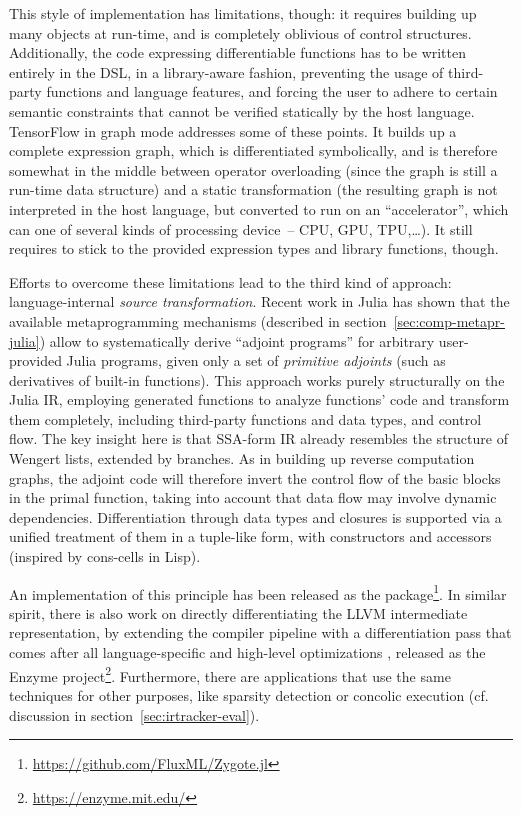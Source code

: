 This style of implementation has limitations, though: it requires building up many objects at
run-time, and is completely oblivious of control structures.  Additionally, the code expressing
differentiable functions has to be written entirely in the DSL, in a library-aware fashion,
preventing the usage of third-party functions and language features, and forcing the user to adhere
to certain semantic constraints that cannot be verified statically by the host language.  TensorFlow
in graph mode addresses some of these points.  It builds up a complete expression graph, which is
differentiated symbolically, and is therefore somewhat in the middle between operator overloading
(since the graph is still a run-time data structure) and a static transformation (the resulting
graph is not interpreted in the host language, but converted to run on an \enquote{accelerator},
which can one of several kinds of processing device~-- CPU, GPU, TPU,\ldots).  It still requires to
stick to the provided expression types and library functions, though.

Efforts to overcome these limitations lead to the third kind of approach: language-internal
\emph{source transformation}.  Recent work in Julia \parencite{innes2018don} has shown that the
available metaprogramming mechanisms (described in section~\ref{sec:comp-metapr-julia}) allow to
systematically derive \enquote{adjoint programs} for arbitrary user-provided Julia programs, given
only a set of \emph{primitive adjoints} (such as derivatives of built-in functions).  This approach
works purely structurally on the Julia IR, employing generated functions to analyze functions' code
and transform them completely, including third-party functions and data types, and control flow.
The key insight here is that SSA-form IR already resembles the structure of Wengert lists, extended
by branches.  As in building up reverse computation graphs, the adjoint code will therefore invert
the control flow of the basic blocks in the primal function, taking into account that data flow may
involve dynamic dependencies.  Differentiation through data types and closures is supported via a
unified treatment of them in a tuple-like form, with constructors and accessors (inspired by
cons-cells in Lisp).

An implementation of this principle has been released as the 
package\footnote{\url{https://github.com/FluxML/Zygote.jl}}.  In similar spirit, there is also work
on directly differentiating the LLVM intermediate representation, by extending the compiler pipeline
with a differentiation pass that comes after all language-specific and high-level optimizations
\parencite{moses2020instead}, released as the Enzyme
project\footnote{\protect\url{https://enzyme.mit.edu/}}.  Furthermore, there are applications that
use the same techniques for other purposes, like sparsity detection \parencite{gowda2019sparsity} or
concolic execution \parencite{churavy2019vchuravy} (cf. discussion in
section~\ref{sec:irtracker-eval}).

